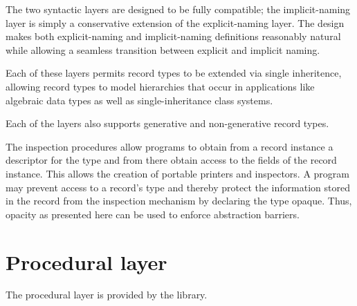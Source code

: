 The two syntactic layers are designed to be fully compatible; the
implicit-naming layer is simply a conservative extension of the
explicit-naming layer.  The design makes both explicit-naming and
implicit-naming definitions reasonably natural while allowing a seamless
transition between explicit and implicit naming.

Each of these layers permits record types to be extended via single
inheritence, allowing record types to model hierarchies that occur in
applications like algebraic data types as well as single-inheritance class
systems.

Each of the layers also supports generative and non-generative record types.

The inspection procedures allow programs to obtain from a record instance a
descriptor for the type and from there obtain access to the fields of the
record instance. This allows the creation of portable printers and inspectors.
A program may prevent access to a record's type and thereby protect the
information stored in the record from the inspection mechanism by declaring the
type opaque. Thus, opacity as presented here can be used to enforce abstraction
barriers.

\section{Procedural layer}

The procedural layer is provided by the  library.

